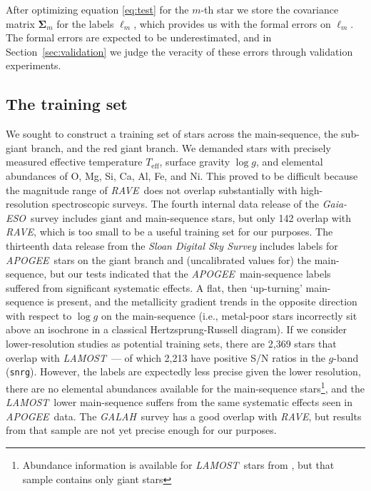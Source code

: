 \documentclass[preprint,trackchanges]{aastex}
\newcommand{\acronym}[1]{{\small{#1}}}
\newcommand{\project}[1]{\textsl{#1}}
\newcommand{\rave}{\project{\acronym{RAVE}}}
\newcommand{\galah}{\project{\acronym{GALAH}}}
\newcommand{\ges}{\project{Gaia-ESO}}
\newcommand{\apogee}{\project{\acronym{APOGEE}}}
\newcommand{\lamost}{\project{\acronym{LAMOST}}}
\newcommand{\teff}{T_{\mathrm{eff}}}
\newcommand{\logg}{\log g}
\begin{document}
After optimizing equation \ref{eq:test} for the $m$-th star we store the covariance matrix 
$\bm{\Sigma}_m$ for the labels $\ell_m$, which provides us with the formal errors on $\ell_m$. 
The formal errors are expected to be underestimated, and in Section~\ref{sec:validation} 
we judge the veracity of these errors through validation experiments.



\subsection{The training set}
\label{sec:the-training-set}


We sought to construct a training set of stars across the main-sequence, the
sub-giant branch, and the red giant branch.  We demanded stars with precisely measured
effective temperature $\teff$, surface gravity $\logg$, and elemental abundances
of O, Mg, Si, Ca, Al, Fe, and Ni.  This proved to be difficult because the magnitude
range of \rave\ does not overlap substantially with high-resolution spectroscopic
surveys.  The fourth internal data release of the \ges\ survey includes 
giant and main-sequence stars, but only 142 overlap with \rave, which is too small to
be a useful training set for our purposes.  The thirteenth data release from the 
\project{Sloan Digital Sky Survey} \citep{sloan_dr13} includes labels for \apogee\ stars on the
giant branch and (uncalibrated values for) the main-sequence, but our tests indicated
that the \apogee\ main-sequence labels suffered from significant systematic effects.  
A flat, then `up-turning' main-sequence is present, and the metallicity gradient trends in 
the opposite direction with respect to $\logg$ on the main-sequence (i.e., metal-poor
stars incorrectly sit above an isochrone in a classical Hertzsprung-Russell diagram).
If we consider lower-resolution studies as potential training sets, there are 2,369
stars that overlap with \lamost\ --- of which 2,213 have positive S/N ratios in the 
$g$-band (\texttt{snrg}).  However, the labels are expectedly less precise given the
lower resolution, there are no elemental abundances available for the main-sequence 
stars\footnote{Abundance information is available for \lamost\ stars from \citet{Ho_2016},
but that sample contains only giant stars}, and the \lamost\ lower main-sequence suffers
from the same systematic effects seen in \apogee\ data.  The \galah\ survey has a good 
overlap with \rave, but results from that sample are not yet precise enough for our 
purposes.
\end{document}
